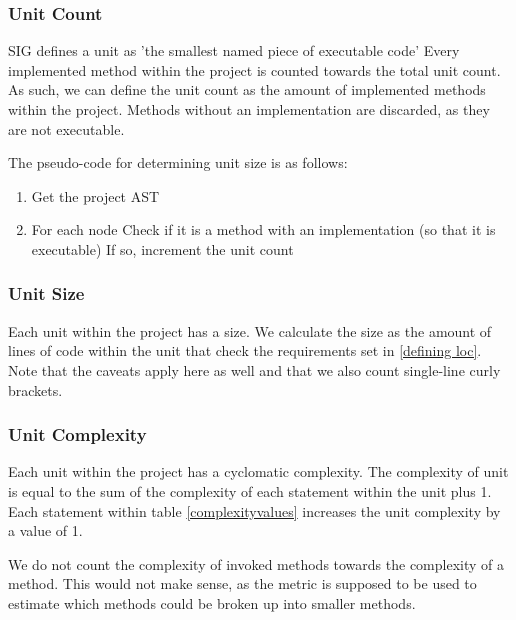 \documentclass{article}
\begin{document}
\subsubsection{Unit Count}
SIG defines a unit as 'the smallest named piece of executable code'
Every implemented method within the project is counted towards the total unit count. As such, we can define the unit count as the amount of implemented methods within the project. Methods without an implementation are discarded, as they are not executable.

The pseudo-code for determining unit size is as follows:
\begin{enumerate}
\item Get the project AST
\item For each node
\subitem Check if it is a method with an implementation (so that it is executable)
\subitem If so, increment the unit count
\end{enumerate}

\subsubsection{Unit Size}
Each unit within the project has a size. We calculate the size as the amount of lines of code within the unit that check the requirements set in \ref{defining loc}. Note that the caveats apply here as well and that we also count single-line curly brackets.

\subsubsection{Unit Complexity}
Each unit within the project has a cyclomatic complexity. The complexity of unit is equal to the  sum of the complexity of each statement within the unit plus 1. Each statement within table \ref{complexityvalues} increases the unit complexity by a value of 1.

We do not count the complexity of invoked methods towards the complexity of a method. This would not make sense, as the metric is supposed to be used to estimate which methods could be broken up into smaller methods.
\end{document}
